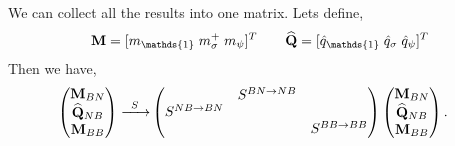 \documentclass[12pt,a4paper]{article}
\newcounter{arrow}
\newcommand{\unit}{\mathds{1}}
\begin{document}
We can collect all the results into one matrix. 
Lets define,
\begin{align}
{\bf M} = [ m_\unit \;  m_\sigma^+\;  m_\psi]^T \qquad \widehat{{\bf Q} }= [\hat{q}_\unit \; \hat{q}_\sigma \; \hat{q}_\psi ]^T
\end{align}
Then we have,
\begin{align}
\left( \begin{matrix}
{\bf M}_{BN}\\
\widehat{{\bf Q} }_{NB}\\
{\bf M}_{BB}\\
\end{matrix} \right)
\xrightarrow{\;\; S \; \; } & \left( \begin{matrix}
&S^{BN \rightarrow NB}&\\
S^{NB \rightarrow BN}&&\\
&&S^{BB \rightarrow BB}\\
\end{matrix} \right)
\left( \begin{matrix}
{\bf M}_{BN}\\
\widehat{{\bf Q} }_{NB}\\
{\bf M}_{BB}\\
\end{matrix} \right).
\end{align}
\end{document}
